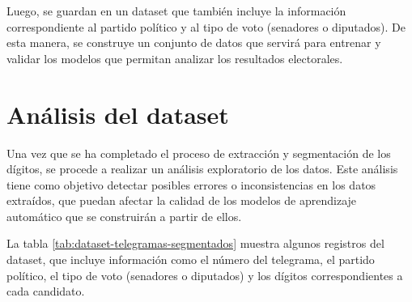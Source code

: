 Luego, se guardan en un dataset que también incluye la información correspondiente al partido político y al tipo de
voto (senadores o diputados). De esta manera, se construye un conjunto de datos que servirá para entrenar y validar los
modelos que permitan analizar los resultados electorales.

\section{Análisis del dataset}

Una vez que se ha completado el proceso de extracción y segmentación de los dígitos, se procede a realizar un análisis
exploratorio de los datos. Este análisis tiene como objetivo detectar posibles errores o inconsistencias en los datos
extraídos, que puedan afectar la calidad de los modelos de aprendizaje automático que se construirán a partir de ellos.

La tabla \ref{tab:dataset-telegramas-segmentados} muestra algunos registros del dataset, que incluye información como
el número del telegrama, el partido político, el tipo de voto (senadores o diputados) y los dígitos correspondientes a
cada candidato.

